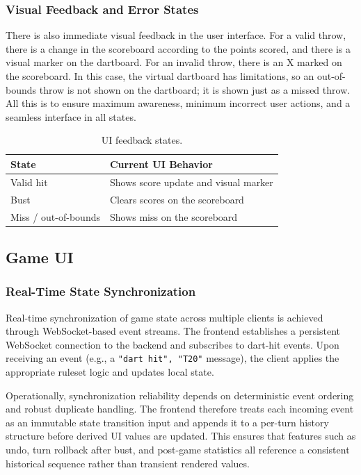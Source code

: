 \subsubsection{Visual Feedback and Error States}
There is also immediate visual feedback in the user interface. For a valid throw, there is a change in the scoreboard according to the points scored, and there is a visual marker on the dartboard. For an invalid throw, there is an X marked on the scoreboard. In this case, the virtual dartboard has limitations, so an out-of-bounds throw is not shown on the dartboard; it is shown just as a missed throw. All this is to ensure maximum awareness, minimum incorrect user actions, and a seamless interface in all states.

\begin{table}[H]
  \centering
  \begin{tabularx}{\linewidth}{@{}X X@{}}
    \toprule
    \textbf{State} & \textbf{Current UI Behavior} \\
    \midrule
    Valid hit & Shows score update and visual marker\\
    Bust & Clears scores on the scoreboard\\
    Miss / out-of-bounds & Shows miss on the scoreboard \\
    \bottomrule
  \end{tabularx}
  \caption{UI feedback states.}
  \label{tab:ui_feedback_states_todo}
\end{table}


\subsection{Game UI}

\subsubsection{Real-Time State Synchronization}
Real-time synchronization of game state across multiple clients is achieved through WebSocket-based event streams. The frontend establishes a persistent WebSocket connection to the backend and subscribes to dart-hit events. Upon receiving an event (e.g., a \texttt{"dart hit", "T20"} message), the client applies the appropriate ruleset logic and updates local state.

Operationally, synchronization reliability depends on deterministic event ordering and robust duplicate handling. The frontend therefore treats each incoming event as an immutable state transition input and appends it to a per-turn history structure before derived UI values are updated. This ensures that features such as undo, turn rollback after bust, and post-game statistics all reference a consistent historical sequence rather than transient rendered values.

